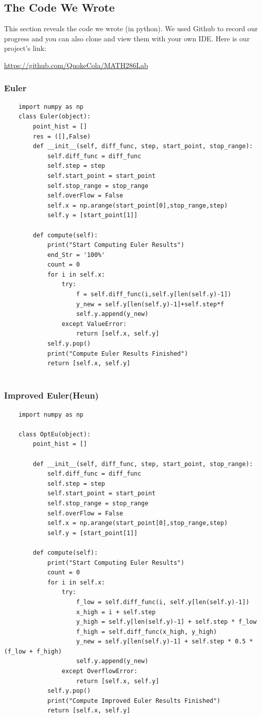 \documentclass[11pt,a4paper]{article}
\begin{document}
\subsection{The Code We Wrote}

This section reveals the code we wrote (in python). We used Github to record our progress and you can also clone and view them with your own IDE. Here is our project's link:

\begin{center}
	\url{https://github.com/QuokeCola/MATH286Lab}
\end{center}

\subsubsection{Euler}\label{Euler}
\scriptsize


\begin{lstlisting}
	import numpy as np
	class Euler(object):
		point_hist = []
		res = ([],False)
		def __init__(self, diff_func, step, start_point, stop_range):
			self.diff_func = diff_func
			self.step = step
			self.start_point = start_point
			self.stop_range = stop_range
			self.overFlow = False
			self.x = np.arange(start_point[0],stop_range,step)
			self.y = [start_point[1]]
	
		def compute(self):
			print("Start Computing Euler Results")
			end_Str = '100%'
			count = 0
			for i in self.x:
				try:
					f = self.diff_func(i,self.y[len(self.y)-1])
					y_new = self.y[len(self.y)-1]+self.step*f
					self.y.append(y_new)
				except ValueError:
					return [self.x, self.y]
			self.y.pop()
			print("Compute Euler Results Finished")
			return [self.x, self.y]
		
\end{lstlisting}
\subsubsection{Improved Euler(Heun)}\label{Heun}
\begin{lstlisting}
	import numpy as np

	class OptEu(object):
		point_hist = []

		def __init__(self, diff_func, step, start_point, stop_range):
			self.diff_func = diff_func
			self.step = step
			self.start_point = start_point
			self.stop_range = stop_range
			self.overFlow = False
			self.x = np.arange(start_point[0],stop_range,step)
			self.y = [start_point[1]]

		def compute(self):
			print("Start Computing Euler Results")
			count = 0
			for i in self.x:
				try:
					f_low = self.diff_func(i, self.y[len(self.y)-1])
					x_high = i + self.step
					y_high = self.y[len(self.y)-1] + self.step * f_low
					f_high = self.diff_func(x_high, y_high)
					y_new = self.y[len(self.y)-1] + self.step * 0.5 * (f_low + f_high)
					self.y.append(y_new)
				except OverflowError:
					return [self.x, self.y]
			self.y.pop()
			print("Compute Improved Euler Results Finished")
			return [self.x, self.y]
\end{lstlisting}
\end{document}
